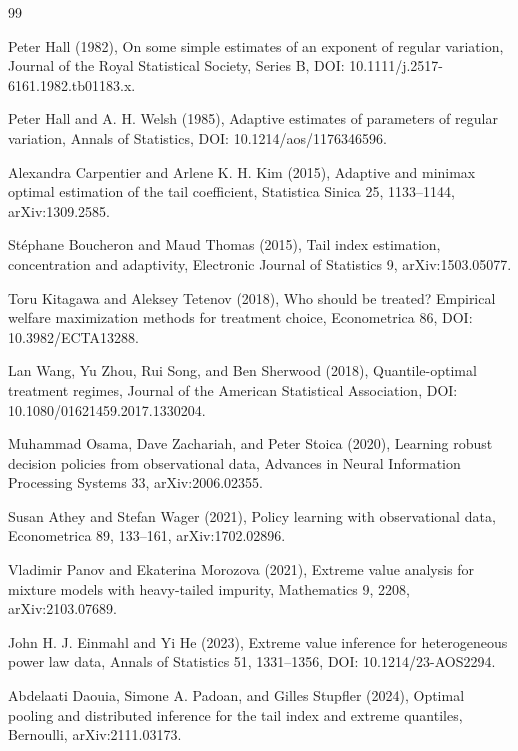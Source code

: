 \documentclass{article}
\begin{document}
\begin{thebibliography}{99}

   Peter Hall (1982), On some simple estimates of an exponent of regular variation, Journal of the Royal Statistical Society, Series B, DOI: 10.1111/j.2517-6161.1982.tb01183.x.

   Peter Hall and A. H. Welsh (1985), Adaptive estimates of parameters of regular variation, Annals of Statistics, DOI: 10.1214/aos/1176346596.

   Alexandra Carpentier and Arlene K. H. Kim (2015), Adaptive and minimax optimal estimation of the tail coefficient, Statistica Sinica 25, 1133--1144, arXiv:1309.2585.

   St\'ephane Boucheron and Maud Thomas (2015), Tail index estimation, concentration and adaptivity, Electronic Journal of Statistics 9, arXiv:1503.05077.

   Toru Kitagawa and Aleksey Tetenov (2018), Who should be treated? Empirical welfare maximization methods for treatment choice, Econometrica 86, DOI: 10.3982/ECTA13288.

   Lan Wang, Yu Zhou, Rui Song, and Ben Sherwood (2018), Quantile-optimal treatment regimes, Journal of the American Statistical Association, DOI: 10.1080/01621459.2017.1330204.

   Muhammad Osama, Dave Zachariah, and Peter Stoica (2020), Learning robust decision policies from observational data, Advances in Neural Information Processing Systems 33, arXiv:2006.02355.

   Susan Athey and Stefan Wager (2021), Policy learning with observational data, Econometrica 89, 133--161, arXiv:1702.02896.

   Vladimir Panov and Ekaterina Morozova (2021), Extreme value analysis for mixture models with heavy-tailed impurity, Mathematics 9, 2208, arXiv:2103.07689.

   John H. J. Einmahl and Yi He (2023), Extreme value inference for heterogeneous power law data, Annals of Statistics 51, 1331--1356, DOI: 10.1214/23-AOS2294.

   Abdelaati Daouia, Simone A. Padoan, and Gilles Stupfler (2024), Optimal pooling and distributed inference for the tail index and extreme quantiles, Bernoulli, arXiv:2111.03173.


\end{thebibliography}
\end{document}
